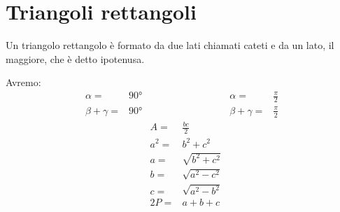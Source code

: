 \section{Triangoli rettangoli}
 Un triangolo rettangolo è formato da due lati chiamati cateti e da un lato, il maggiore, che è detto ipotenusa.\par Avremo:\begin{align*}
 \alpha=&{}\ang{90}&&&\alpha=&{}\frac{\pi}{2}\\
 \beta+\gamma=&{}\ang{90}&&&\beta+\gamma=&{}\frac{\pi}{2}\\
 &&A={}&\frac{bc}{2}\\
 &&a^2={}&b^2+c^2\\
  &&a={}&\sqrt{b^2+c^2}\\
  &&b={}&\sqrt{a^2-c^2}\\
  &&c={}&\sqrt{a^2-b^2}\\
  &&2P=&a+b+c
 \end{align*}
